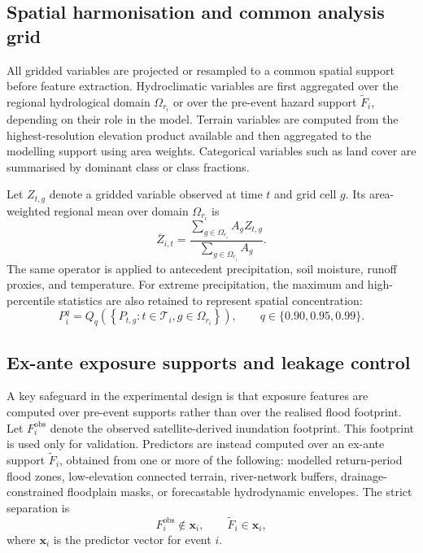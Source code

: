 \documentclass[pdflatex,sn-mathphys-ay]{sn-jnl}
\theoremstyle{thmstyleone}
\theoremstyle{thmstylethree}
\theoremstyle{thmstyletwo}
\begin{document}
\begin{appendices}
\subsection{Spatial harmonisation and common analysis grid}
\label{app:spatial_harmonisation}

All gridded variables are projected or resampled to a common spatial
support before feature extraction.  Hydroclimatic variables are first
aggregated over the regional hydrological domain
$\Omega_{r_i}$ or over the pre-event hazard support
$\widetilde{F}_i$, depending on their role in the model.  Terrain
variables are computed from the highest-resolution elevation product
available and then aggregated to the modelling support using area
weights.  Categorical variables such as land cover are summarised by
dominant class or class fractions.

Let $Z_{t,g}$ denote a gridded variable observed at time $t$ and grid
cell $g$.  Its area-weighted regional mean over domain
$\Omega_{r_i}$ is
\begin{equation}
  \overline{Z}_{i,t}
  =
  \frac{
    \displaystyle
    \sum_{g\in\Omega_{r_i}} A_g Z_{t,g}
  }{
    \displaystyle
    \sum_{g\in\Omega_{r_i}} A_g
  }.
  \label{eq:app_area_mean}
\end{equation}
The same operator is applied to antecedent precipitation, soil
moisture, runoff proxies, and temperature.  For extreme precipitation,
the maximum and high-percentile statistics are also retained to
represent spatial concentration:
\begin{equation}
  P^{q}_{i}
  =
  Q_q
  \left(
    \left\{
      P_{t,g}:t\in\mathcal{T}_{i},
      g\in\Omega_{r_i}
    \right\}
  \right),
  \qquad
  q\in\{0.90,0.95,0.99\}.
  \label{eq:app_precip_quantile}
\end{equation}

\subsection{Ex-ante exposure supports and leakage control}
\label{app:leakage_control}

A key safeguard in the experimental design is that exposure features
are computed over pre-event supports rather than over the realised
flood footprint.  Let $F^{\mathrm{obs}}_i$ denote the observed
satellite-derived inundation footprint.  This footprint is used only
for validation.  Predictors are instead computed over an ex-ante
support $\widetilde{F}_i$, obtained from one or more of the following:
modelled return-period flood zones, low-elevation connected terrain,
river-network buffers, drainage-constrained floodplain masks, or
forecastable hydrodynamic envelopes.  The strict separation is
\begin{equation}
  F^{\mathrm{obs}}_i
  \notin
  \mathbf{x}_{i},
  \qquad
  \widetilde{F}_i
  \in
  \mathbf{x}_{i},
  \label{eq:app_leakage_rule}
\end{equation}
where $\mathbf{x}_{i}$ is the predictor vector for event $i$.


\end{appendices}
\end{document}
